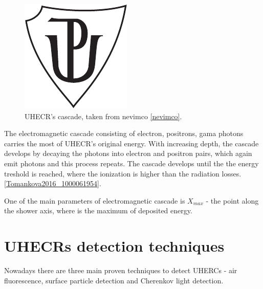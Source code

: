 \begin{figure}[H]
 \centering
 \includegraphics{up_logo_bw}
 \caption{UHECR's cascade, taken from nevimco \ref{nevimco}.}
 \label{cascade}
 
\end{figure}

\par

The electromagnetic cascade consisting of electron, positrons, gama photons carries the most of UHECR's original energy. With increasing depth, the cascade develops by decaying the photons into electron and positron pairs, which again emit photons and this process repeats. The cascade develops until the the energy treshold is reached, where the ionization is higher than the radiation losses. \ref{Tomankova2016_1000061954}.


\par
One of the main parameters of electromagnetic cascade is $X_{max}$ - the point along the shower axis, where is the maximum of deposited energy.

\section{UHECRs detection techniques}
Nowadays there are three main proven techniques to detect UHERCs - 
air fluorescence, surface particle detection and Cherenkov light detection.

